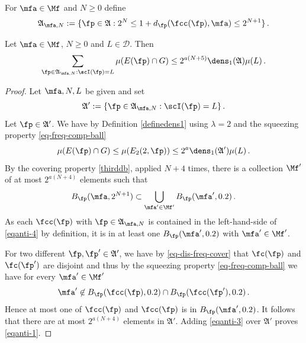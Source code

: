 For $\mfa \in \Mf$ and $N\ge 0$ define
\begin{equation}\label{eqantidefap}
    \mathfrak{A}_{\mfa,N}:=\{\fp\in\mathfrak{A}: 2^{N}\le 1+d_{\fp}(\fcc(\fp), \mfa)\le 2^{N+1}\} \, .
\end{equation}


\begin{lemma}
\label{stack-density}
\leanok
{}
Let $\mfa \in \Mf$, $N\ge 0$ and
$L\in \mathcal{D}$. Then
\begin{equation}\label{eqanti-1}
    \sum_{\fp\in\mathfrak{A}_{\mfa,N}:\scI(\fp)=L}\mu(E(\fp)\cap G)\le 2^{a(N+5)}\dens_1(\mathfrak{A})\mu(L)\, .
\end{equation}
\end{lemma}
\begin{proof}
Let $\mfa,N,L$ be given and set
\begin{equation}
\mathfrak{A}':=\{\fp\in\mathfrak{A}_{\mfa,N}:\scI(\fp)=L\}\, .
\end{equation}
Let
$\fp\in\mathfrak{A}'$.
We have
by Definition \eqref{definedens1}
using $\lambda=2$ and the squeezing property \eqref{eq-freq-comp-ball}
\begin{equation}\label{eqanti-3}
\mu(E(\fp)\cap G)\le \mu(E_2(2, \fp))\le 2^{a}\dens_1(\mathfrak{A}')\mu(L)\, .
\end{equation}
By the covering property \eqref{thirddb}, applied $N+4$ times, there is a collection $\Mf'$ of at most $2^{a(N+4)}$
elements such that
\begin{equation}\label{eqanti-4}
    B_{\fp}(\mfa, 2^{N+1})\subset \bigcup_{\mfa'\in \Mf'}
    B_{\fp}(\mfa', 0.2)\, .
\end{equation}
As each $\fcc(\fp)$ with $\fp\in \mathfrak{A}_{\mfa,N}$
is contained in the left-hand-side
of \eqref{eqanti-4}
by definition, it is in at least one $B_{\fp}(\mfa', 0.2)$
with $\mfa'\in \Mf'$.


For two different $\fp,\fp'\in \mathfrak{A}'$, we have by
\eqref{eq-dis-freq-cover} that
$\fc(\fp)$ and $\fc(\fp')$ are disjoint and thus by the squeezing property \eqref{eq-freq-comp-ball} we have for every $\mfa'\in \Mf'$
\begin{equation}
    \mfa'\not\in B_{\fp}(\fcc(\fp), 0.2)\cap
B_{\fp}(\fcc(\fp'), 0.2)\, .
\end{equation}
Hence at most one of $\fcc(\fp)$
and $\fcc(\fp)$ is in
$B_{\fp}(\mfa', 0.2)$.
It follows that there are at most $2^{a(N+4)}$ elements in
$\mathfrak{A}'$. Adding \eqref{eqanti-3} over $\mathfrak{A}'$ proves
\eqref{eqanti-1}.
\end{proof}


